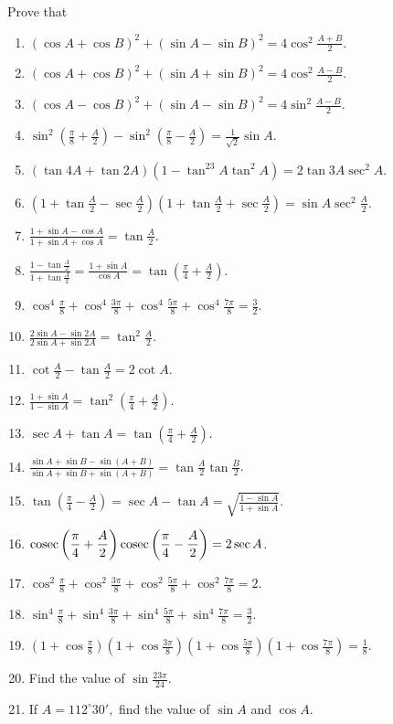 Prove that

\begin{enumerate}[resume]
\item $(\cos A + \cos B)^2 + (\sin A - \sin B)^2 = 4\cos^2 \frac{A + B}{2}$.
\item $(\cos A + \cos B)^2 + (\sin A + \sin B)^2 = 4\cos^2 \frac{A - B}{2}$.
\item $(\cos A - \cos B)^2 + (\sin A - \sin B)^2 = 4\sin^2 \frac{A - B}{2}$.
\item $\sin^2\left(\frac{\pi}{8} + \frac{A}{2}\right) - \sin^2\left(\frac{\pi}{8} -\frac{A}{2}\right) = \frac{1}{\sqrt{2}}\sin
  A$.
\item $(\tan 4A + \tan 2A)(1 - \tan^23A\tan^2A) = 2\tan 3A\sec^2A$.
\item $\left(1 + \tan \frac{A}{2} - \sec\frac{A}{2}\right)\left(1 + \tan \frac{A}{2} + \sec\frac{A}{2}\right) = \sin
  A\sec^2\frac{A}{2}$.
\item $\frac{1 + \sin A - \cos A}{1 + \sin A + \cos A} = \tan \frac{A}{2}$.
\item $\frac{1 - \tan \frac{A}{2}}{1 + \tan \frac{A}{2}} = \frac{1 + \sin A}{\cos A} = \tan \left(\frac{\pi}{4} +
  \frac{A}{2}\right)$.
\item $\cos^4\frac{\pi}{8} + \cos^4 \frac{3\pi}{8} + \cos^4\frac{5\pi}{8} + \cos^4\frac{7\pi}{8}= \frac{3}{2}$.
\item $\frac{2\sin A - \sin2A}{2\sin A + \sin 2A} = \tan^2\frac{A}{2}$.
\item $\cot \frac{A}{2} - \tan \frac{A}{2} = 2\cot A$.
\item $\frac{1 + \sin A}{1 - \sin A} = \tan^2\left(\frac{\pi}{4} + \frac{A}{2}\right)$.
\item $\sec A + \tan A = \tan\left(\frac{\pi}{4} + \frac{A}{2}\right)$.
\item $\frac{\sin A + \sin B - \sin(A + B)}{\sin A + \sin B + \sin(A + B)} = \tan \frac{A}{2}\tan \frac{B}{2}$.
\item $\tan \left(\frac{\pi}{4} - \frac{A}{2}\right) = \sec A - \tan A = \sqrt{\frac{1 - \sin A}{1 + \sin A}}$.
\item ${\rm cosec}\left(\frac{\pi}{4} + \frac{A}{2}\right){\rm cosec} \left(\frac{\pi}{4} - \frac{A}{2}\right) = 2\sec A$.
\item $\cos^2\frac{\pi}{8} + \cos^2\frac{3\pi}{8} + \cos^2\frac{5\pi}{8} + \cos^2\frac{7\pi}{8} = 2$.
\item $\sin^4\frac{\pi}{8} + \sin^4 \frac{3\pi}{8} + \sin^4\frac{5\pi}{8} + \sin^4\frac{7\pi}{8} = \frac{3}{2}$.
\item $\left(1 + \cos \frac{\pi}{8}\right)\left(1 + \cos\frac{3\pi}{8}\right)\left(1 + \cos\frac{5\pi}{8}\right)\left(1 + \cos
  \frac{7\pi}{8}\right) = \frac{1}{8}$.
\item Find the value of $\sin \frac{23\pi}{24}$.
\item If $A = 112^\circ30',$ find the value of $\sin A$ and $\cos A$.
\end{enumerate}

